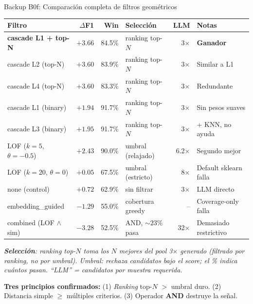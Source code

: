 \begin{frame}{Backup B0f: Comparación completa de filtros geométricos}
\centering
\scriptsize
\setlength{\tabcolsep}{4pt}
\begin{tabular}{@{}lrrlrl@{}}
\toprule
Filtro                & $\Delta$F1 & Win & Selección & LLM & Notas \\
\midrule
\rowcolor{uaigreen!12}
\textbf{cascade L1 + top-N} & \alert{$+3{.}66$} & 84.5\% & ranking top-$N$ & 3$\times$   & \textbf{Ganador} \\
cascade L2 (top-N)         & $+3{.}60$ & 83.9\% & ranking top-$N$ & 3$\times$  & Similar a L1 \\
cascade L4 (top-N)         & $+3{.}60$ & 83.3\% & ranking top-$N$ & 3$\times$  & Redundante \\
cascade L1 (binary)        & $+1{.}94$ & 91.7\% & ranking top-$N$ & 3$\times$  & Sin pesos suaves \\
cascade L3 (binary)        & $+1{.}95$ & 91.7\% & ranking top-$N$ & 3$\times$  & + KNN, no ayuda \\
\addlinespace[2pt]
LOF ($k{=}5$, $\theta{=}{-}0{.}5$) & $+2{.}43$ & 90.0\% & umbral (relajado)   & 6.2$\times$  & Segundo mejor \\
LOF ($k{=}20$, $\theta{=}0$)       & $+0{.}05$ & 67.5\% & umbral (estricto)   & 8$\times$    & Default sklearn falla \\
\addlinespace[2pt]
none (control)            & $+0{.}72$ & 62.9\% & sin filtrar          & 3$\times$    & LLM directo \\
\addlinespace[2pt]
\rowcolor{uaiorange!10}
embedding\_guided         & $-1{.}29$ & 55.0\% & cobertura greedy     & --           & Coverage-only falla \\
\rowcolor{uaiorange!10}
combined (LOF $\land$ sim) & $-3{.}28$ & 52.5\% & AND, $\sim\!23\%$ pasa & 32$\times$ & Demasiado restrictivo \\
\bottomrule
\end{tabular}

\vspace{0.2em}
{\scriptsize\itshape \textbf{Selección}: \emph{ranking top-$N$} toma los $N$ mejores del pool 3$\times$ generado (filtrado por ranking, no por umbral). \emph{Umbral}: rechaza candidatos bajo el score; el \% indica cuántos pasan. ``LLM'' = candidatos por muestra requerida.}

\vspace{0.2em}
\begin{insight}
\scriptsize \textbf{Tres principios confirmados:}
(1) \textit{Ranking} top-$N$ $>$ umbral duro.\hspace{0.5em}
(2) Distancia simple $\geq$ múltiples criterios.\hspace{0.5em}
(3) Operador \textbf{AND} destruye la señal.
\end{insight}
\end{frame}


